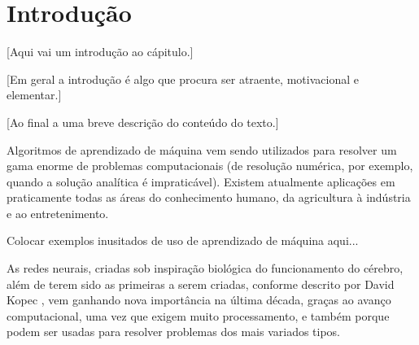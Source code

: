 
\chapter{Introdução}
\label{cap:introducao}

[Aqui vai um introdução ao cápitulo.]

[Em geral a introdução é algo que procura ser atraente, motivacional e elementar.]

[Ao final a uma breve descrição do conteúdo do texto.]

Algoritmos de aprendizado de máquina vem sendo utilizados para resolver um gama enorme de problemas computacionais (de resolução numérica, por exemplo, quando a solução analítica é impraticável). Existem atualmente aplicações em praticamente todas as áreas do conhecimento humano, da agricultura à indústria e ao entretenimento.

Colocar exemplos inusitados de uso de aprendizado de máquina aqui...

As redes neurais, criadas sob inspiração biológica do funcionamento do cérebro, além de terem sido as primeiras a serem criadas, conforme descrito por David Kopec \citep{classic}, vem ganhando nova importância na última década, graças ao avanço computacional, uma vez que exigem muito processamento, e também porque podem ser usadas para resolver problemas dos mais variados tipos.
